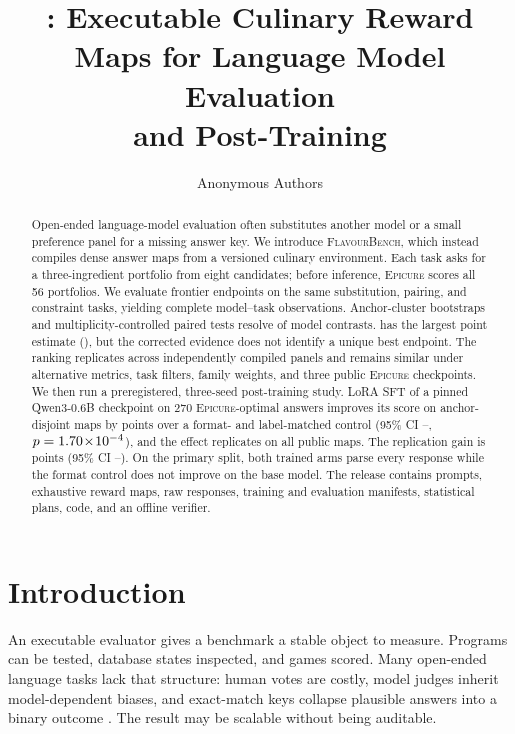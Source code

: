 \documentclass{article}
\title{\system{}: Executable Culinary Reward Maps for Language Model Evaluation\\
and Post-Training}
\author{Anonymous Authors}
\newcommand{\system}{\textsc{FlavourBench}}
\newcommand{\epicure}{\textsc{Epicure}}
\begin{document}
\maketitle

\begin{abstract}
Open-ended language-model evaluation often substitutes another model or a small preference panel
for a missing answer key. We introduce \system{}, which instead compiles dense answer maps from a
versioned culinary environment. Each task asks for a three-ingredient portfolio from eight
candidates; before inference, \epicure{} scores all 56 portfolios. We evaluate \FBModels{} frontier
endpoints on the same \FBTasks{} substitution, pairing, and constraint tasks, yielding
\FBCompleteCells{} complete model--task observations. Anchor-cluster bootstraps and
multiplicity-controlled paired tests resolve \FBSignificantPairs{} of \FBPairs{} model contrasts.
\FBTopModel{} has the largest point estimate (\FBTopScore{}), but the corrected evidence does not
identify a unique best endpoint. The ranking replicates across independently compiled panels and
remains similar under alternative metrics, task filters, family weights, and three public
\epicure{} checkpoints. We then run a preregistered, three-seed post-training study. LoRA SFT of a
pinned Qwen3-0.6B checkpoint on 270 \epicure{}-optimal answers improves its score on
\FBTransferPrimaryTasks{} anchor-disjoint maps by \FBTransferPrimaryGain{} points over a format-
and label-matched control (95\% CI \FBTransferPrimaryCILow{}--\FBTransferPrimaryCIHigh{},
$p=1.70\!\times\!10^{-4}{}$), and the effect replicates on all \FBTransferPublicTasks{} public maps.
The replication gain is \FBTransferPublicGain{} points (95\% CI
\FBTransferPublicCILow{}--\FBTransferPublicCIHigh{}). On the primary split, both trained arms parse
every response while the format control does not improve on the base model. The release contains
prompts, exhaustive reward maps, raw responses, training and
evaluation manifests, statistical plans, code, and an offline verifier.
\end{abstract}

\section{Introduction}

An executable evaluator gives a benchmark a stable object to measure. Programs can be tested,
database states inspected, and games scored. Many open-ended language tasks lack that structure:
human votes are costly, model judges inherit model-dependent biases, and exact-match keys collapse
plausible answers into a binary outcome \citep{zheng2023judging,chiang2024chatbotarena}. The result
may be scalable without being auditable.
\end{document}
